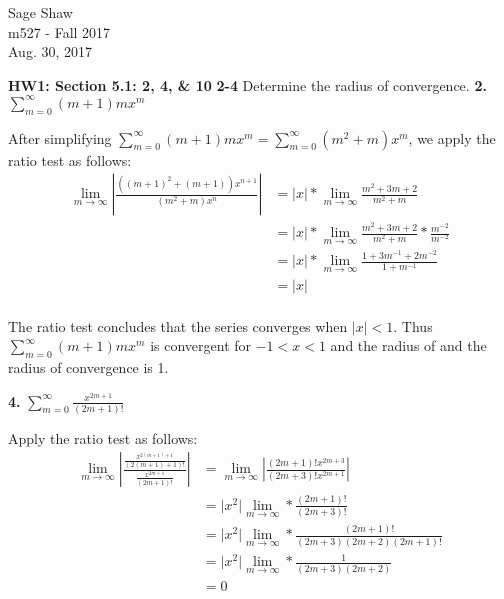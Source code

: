 \documentclass{article}
\begin{document}
	\thispagestyle{empty}
	
	\begin{flushright}
		Sage Shaw \\
		m527 - Fall 2017 \\
		Aug. 30, 2017
	\end{flushright}
	
	{\large \textbf{HW1: Section 5.1: 2, 4, \& 10}}\bigbreak
	\textbf{2-4} \space Determine the radius of convergence.\bigbreak
	\textbf{2.} $\sum\limits_{m=0}^{\infty} (m+1)mx^{m}$
	
	
	After simplifying $\sum\limits_{m=0}^{\infty} (m+1)mx^{m} = \sum\limits_{m=0}^{\infty} (m^{2}+m)x^{m}$, we apply the ratio test as follows:
	\begin{equation*}
	\begin{split}
	\lim_{m\to\infty} \left\lvert \frac{((m+1)^{2}+(m+1))x^{n+1}}{(m^{2}+m)x^{n}}\right\rvert
	& = \lvert x \rvert * \lim_{m\to\infty} \frac{m^{2}+3m+2}{m^{2}+m} \\
	& = \lvert x \rvert * \lim_{m\to\infty} \frac{m^{2}+3m+2}{m^{2}+m} * \frac{m^{-2}}{m^{-2}} \\
	& = \lvert x \rvert * \lim_{m\to\infty} \frac{1+3m^{-1}+2m^{-2}}{1+m^{-1}} \\
	& = \lvert x \rvert\\
	\end{split}
	\end{equation*}
	
	The ratio test concludes that the series converges when $\lvert x \rvert < 1$. Thus $\sum\limits_{m=0}^{\infty} (m+1)mx^{m}$ is convergent for $ -1 < x < 1$ and the radius of and the radius of convergence is 1.
	
	\bigbreak

	
	\textbf{4.} $\sum\limits_{m=0}^{\infty} \frac{x^{2m+1}}{(2m+1)!}$
	
	Apply the ratio test as follows:
	\begin{equation*}
	\begin{split}
	\lim_{m\to\infty} \left\lvert 
	\frac{
		\frac{x^{2(m+1)+1}}{(2(m+1)+1)!}
	}{
		\frac{x^{2m+1}}{(2m+1)!}
	}
	\right\rvert & = 
	\lim_{m\to\infty} \left\lvert \frac{(2m+1)!x^{2m+3}}{(2m+3)!x^{2m+1}} \right\rvert \\
	& = \lvert x^{2} \rvert \lim_{m\to\infty}  * \frac{(2m+1)!}{(2m+3)!} \\
	& = \lvert x^{2} \rvert  \lim_{m\to\infty} * \frac{(2m+1)!}{(2m+3)(2m+2)(2m+1)!} \\
	& = \lvert x^{2} \rvert  \lim_{m\to\infty} * \frac{1}{(2m+3)(2m+2)} \\
	& = 0
	\end{split}
	\end{equation*}
    
\end{document}
